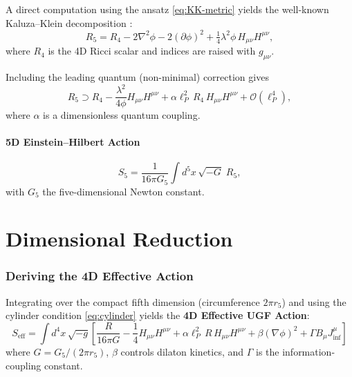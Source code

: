\documentclass[12pt,a4paper]{article}
\newcommand{\gm}{g_{\mu\nu}}       %
\newcommand{\Jinf}{J_{\inf}^{\mu}} %
\newcommand{\lP}{\ell_P}           %
\newcommand{\lam}{\lambda}         %
\newcommand{\Seff}{S_{\text{eff}}} %
\begin{document}
A direct computation using the ansatz \eqref{eq:KK-metric} yields the
well-known Kaluza--Klein decomposition \citep{Overduin1997}:
\begin{equation}
  R_5 = R_4 - 2\nabla^2\phi - 2(\partial\phi)^2
        + \tfrac{1}{4}\lam^2\phi\, H_{\mu\nu}H^{\mu\nu} ,
  \label{eq:R5-decomp}
\end{equation}
where $R_4$ is the 4D Ricci scalar and indices are raised with $\gm$.

Including the leading quantum (non-minimal) correction gives
\begin{equation}
  R_5 \supset R_4 - \frac{\lam^2}{4\phi} H_{\mu\nu}H^{\mu\nu}
       + \alpha \lP^2\, R_4\, H_{\mu\nu}H^{\mu\nu} + \mathcal{O}(\lP^4) ,
  \label{eq:R5-quantum}
\end{equation}
where $\alpha$ is a dimensionless quantum coupling.

\subsection{5D Einstein--Hilbert Action}

\begin{equation}
  S_5 = \frac{1}{16\pi G_5}\int d^5x\,\sqrt{-G}\;R_5 ,
  \label{eq:S5}
\end{equation}
with $G_5$ the five-dimensional Newton constant.

\part{Dimensional Reduction}

\section{Deriving the 4D Effective Action}
\label{sec:4D-action}

Integrating over the compact fifth dimension (circumference $2\pi r_5$) and
using the cylinder condition \eqref{eq:cylinder} yields the
\textbf{4D Effective UGF Action}:
\begin{equation}
  \boxed{
  \Seff = \int d^4x\,\sqrt{-g}\left[
    \frac{R}{16\pi G}
    - \frac{1}{4}H_{\mu\nu}H^{\mu\nu}
    + \alpha\lP^2\,R\,H_{\mu\nu}H^{\mu\nu}
    + \beta(\nabla\phi)^2
    + \Gamma B_\mu \Jinf
  \right]
  }
  \label{eq:Seff}
\end{equation}
where $G = G_5/(2\pi r_5)$, $\beta$ controls dilaton kinetics, and $\Gamma$
is the information-coupling constant.
\end{document}
